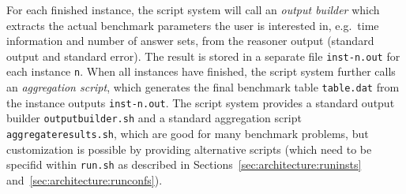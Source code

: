 \documentclass[a4paper]{article}
\begin{document}
		For each finished instance, the script system will call an \emph{output builder}
		which extracts the actual benchmark parameters the user is interested in,
		e.g.~time information and number of answer sets,
		from the reasoner output (standard output and standard error).
		The result is stored in a separate file {\tt inst-n.out} for each instance {\tt n}.
		When all instances have finished, the script system further calls an \emph{aggregation script},
		which generates the final benchmark table {\tt table.dat} from the instance outputs {\tt inst-n.out}.
		The script system provides a standard output builder {\tt outputbuilder.sh} and a standard aggregation script {\tt aggregateresults.sh},
		which are good for many benchmark problems, but customization is possible by providing alternative scripts
		(which need to be specifid within {\tt run.sh} as described in Sections~\ref{sec:architecture:runinsts} and~\ref{sec:architecture:runconfs}).
\end{document}

